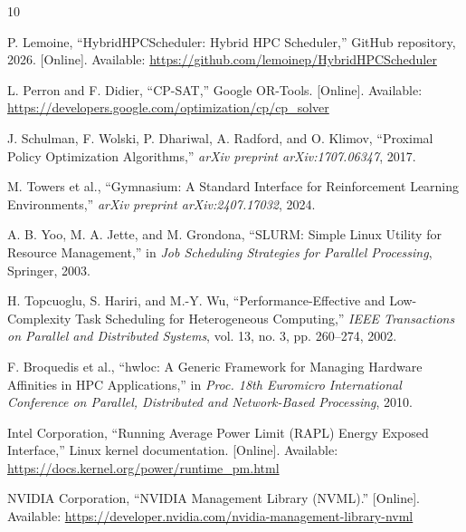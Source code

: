 \documentclass[conference]{IEEEtran}
\begin{document}
\begin{thebibliography}{10}

P. Lemoine, ``HybridHPCScheduler: Hybrid HPC Scheduler,'' GitHub repository,
2026. [Online]. Available:
\url{https://github.com/lemoinep/HybridHPCScheduler}

L. Perron and F. Didier, ``CP-SAT,'' Google OR-Tools. [Online]. Available:
\url{https://developers.google.com/optimization/cp/cp_solver}

J. Schulman, F. Wolski, P. Dhariwal, A. Radford, and O. Klimov, ``Proximal
Policy Optimization Algorithms,'' \textit{arXiv preprint arXiv:1707.06347},
2017.

M. Towers et al., ``Gymnasium: A Standard Interface for Reinforcement Learning
Environments,'' \textit{arXiv preprint arXiv:2407.17032}, 2024.

A. B. Yoo, M. A. Jette, and M. Grondona, ``SLURM: Simple Linux Utility for
Resource Management,'' in \textit{Job Scheduling Strategies for Parallel
Processing}, Springer, 2003.

H. Topcuoglu, S. Hariri, and M.-Y. Wu, ``Performance-Effective and
Low-Complexity Task Scheduling for Heterogeneous Computing,''
\textit{IEEE Transactions on Parallel and Distributed Systems}, vol. 13, no. 3,
pp. 260--274, 2002.

F. Broquedis et al., ``hwloc: A Generic Framework for Managing Hardware
Affinities in HPC Applications,'' in \textit{Proc. 18th Euromicro International
Conference on Parallel, Distributed and Network-Based Processing}, 2010.

Intel Corporation, ``Running Average Power Limit (RAPL) Energy Exposed
Interface,'' Linux kernel documentation. [Online]. Available:
\url{https://docs.kernel.org/power/runtime_pm.html}

NVIDIA Corporation, ``NVIDIA Management Library (NVML).'' [Online]. Available:
\url{https://developer.nvidia.com/nvidia-management-library-nvml}

\end{thebibliography}
\end{document}
